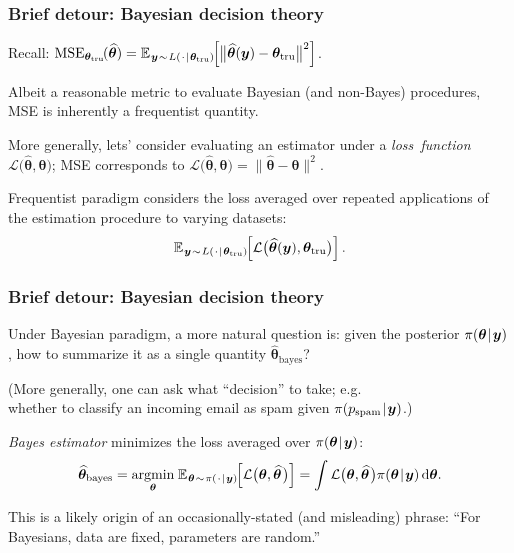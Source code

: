 \documentclass[18pt, handout]{beamer}
\newcommand{\defineTightSpacing}{%
	\setlength{\abovedisplayskip}{.25\baselineskip}%
	\setlength{\belowdisplayskip}{.25\baselineskip}%
}
\renewcommand{\textsc}[1]{{\small \MakeUppercase{#1}}}
\newcommand{\given}{\thinnerspace | \thinnerspace}
\newcommand{\diff}{\operatorname{\mathrm{d}}\!{}}
\DeclareMathOperator*{\argmin}{argmin}
\newcommand{\thinnerspace}{\mskip.5\thinmuskip}
\newcommand{\expectation}{\mathbb{E}}
\newcommand{\truthSub}{\mathrm{tru}}
\newcommand{\density}{\pi}
\newcommand{\likelihood}{L}
\newcommand{\by}{\bm{y}}
\newcommand{\btheta}{\bm{\theta}}
\newcommand{\loss}{\mathcal{L}}
\begin{document}
\begin{frame}
\frametitle{Brief detour: Bayesian decision theory}
Recall: 
$\displaystyle 
\operatorname{MSE}_{\btheta_\truthSub\!}(\widehat{\btheta})
	= \expectation_{\thinnerspace \by \thinnerspace \sim \thinnerspace  \likelihood(\thinnerspace \cdot \given \btheta_\truthSub)\!}\!\left[
		\big\| \widehat{\btheta}(\by) - \btheta_\truthSub \big\|^2
	\right]$.
	
\smallskip
Albeit a reasonable metric to evaluate Bayesian (and non-Bayes) procedures, \textsc{MSE} is inherently a frequentist quantity. 

\smallskip
More generally, lets' consider evaluating an estimator under a \textit{loss~function} $\loss\big(\widehat{\btheta}, \btheta\big)$; \textsc{MSE} corresponds to $\loss\big(\widehat{\btheta}, \btheta\big) = \| \widehat{\btheta} - \btheta \|^2$.

\smallskip
Frequentist paradigm considers the loss averaged over repeated applications of the estimation procedure to varying datasets: %
\begin{equation*} \defineTightSpacing%
\expectation_{\thinnerspace \by \thinnerspace \sim \thinnerspace  \likelihood(\thinnerspace \cdot \given \btheta_\truthSub)\!}\!\left[
		\loss\big(\widehat{\btheta}(\by), \btheta_\truthSub \big)
	\right].
\end{equation*}
\end{frame}


\begin{frame}
\frametitle{Brief detour: Bayesian decision theory}
Under Bayesian paradigm, a more natural question is: given the posterior $\density(\btheta \given \by)$, how to summarize it as a single quantity $\widehat{\btheta}_{\textrm{bayes}}$?

(More generally, one can ask what ``decision'' to take; e.g.\ \\
\hphantom{(}whether to classify an incoming email as spam given $\density(p_\mathrm{spam} \given \by)$.)

\smallskip
\textit{Bayes estimator} minimizes the loss averaged over $\density(\btheta \given \by)$:
\begin{equation*} \defineTightSpacing%
\widehat{\btheta}_{\textrm{bayes}} =
	\argmin_{\btheta} \thinnerspace \expectation_{\thinnerspace \btheta \thinnerspace \sim \thinnerspace \density(\thinnerspace \cdot \given \by)\!}\!\left[
		\loss\big(\btheta, \widehat{\btheta} \thinnerspace \big)
	\right]
	= \int \loss\big(\btheta, \widehat{\btheta} \thinnerspace \big) \density(\btheta \given \by) \diff \btheta.
\end{equation*}

\smallskip
This is a likely origin of an occasionally-stated (and misleading) phrase: 
``For Bayesians, data are fixed, parameters are random.'' 
\end{frame}
\end{document}
